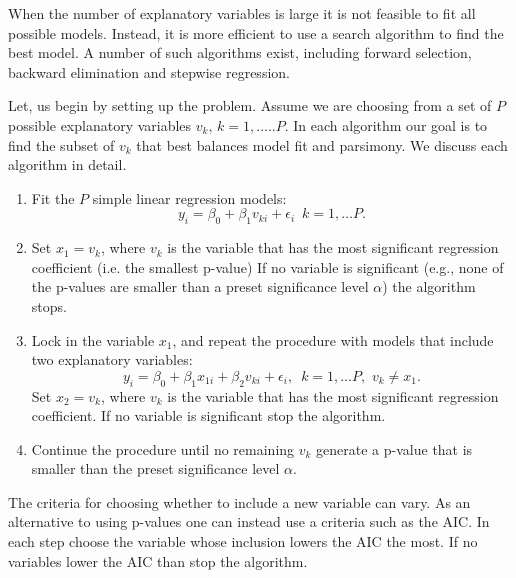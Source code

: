 When the number of explanatory variables is large it is not feasible to fit all possible models. 
Instead, it is more efficient to use a search algorithm to find the best model.
A number of such algorithms exist, including forward selection, backward elimination and stepwise regression.

Let, us begin by setting up the problem. Assume we are choosing from a set of $P$ possible explanatory variables $v_k,\, k=1,…..P$.
In each algorithm our goal is to find the subset of $v_k$ that best balances model fit and parsimony.
We discuss each algorithm in detail.

\bigskip
{}

\begin{enumerate}
\item Fit the $P$ simple linear regression models:
$$
y_i = \beta_0 +\beta_1 v_{ki} + \epsilon_i \,\,\, k = 1,\ldots P.
$$

\item Set $x_1=v_k$, where $v_k$ is the variable that has the most significant regression coefficient (i.e. the smallest p-value) If no variable is significant (e.g., none of the p-values are smaller than a preset significance level $\alpha$) the algorithm stops.

\item Lock in the variable $x_1$, and repeat the procedure with models that include two explanatory variables:
$$
y_i = \beta_0 + \beta_1 x_{1i} + \beta_2 v_{ki} + \epsilon_i, \,\,\, k = 1,\ldots P, \,\, v_k \ne x_1.
$$
Set $x_2=v_k$, where $v_k$ is the variable that has the most significant regression coefficient. If no variable is significant stop the algorithm.

\item Continue the procedure until no remaining $v_k$ generate a p-value that is smaller than the preset significance level $\alpha$.
\end{enumerate}

The criteria for choosing whether to include a new variable can vary.
As an alternative to using p-values one can instead use a criteria such as the AIC.
In each step choose the variable whose inclusion lowers the AIC the most. 
If no variables lower the AIC than stop the algorithm.

\bigskip
{}


